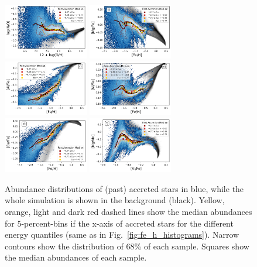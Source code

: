 \documentclass[fleqn,usenatbib]{mnras}
\begin{document}
\begin{figure}
    \centering
    \includegraphics[width=0.33\textwidth]{figures/xfe_feh_zones_NO.png}    \includegraphics[width=0.33\textwidth]{figures/xfe_feh_zones_Mg.png}
    \includegraphics[width=0.33\textwidth]{figures/xfe_feh_zones_Al.png}
    \includegraphics[width=0.33\textwidth]{figures/xfe_feh_zones_Ni.png}
    \includegraphics[width=0.33\textwidth]{figures/xfe_feh_zones_Ba.png}
    \includegraphics[width=0.33\textwidth]{figures/xfe_feh_zones_MgMn.png}
        \caption{Abundance distributions of (past) accreted stars in blue, while the whole simulation is shown in the background (black). Yellow, orange, light and dark red dashed lines show the median abundances for 5-percent-bins if the x-axis of accreted stars for the different energy quantiles (same as in Fig.~\ref{fig:fe_h_histograms}). Narrow contours show the distribution of 68\% of each sample. Squares show the median abundances of each sample.}
    \label{fig:xfe_feh_zones}
\end{figure}
\end{document}
